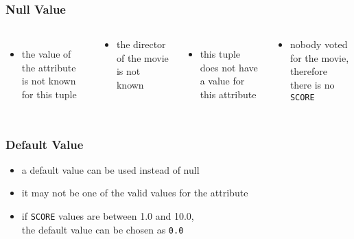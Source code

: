 \documentclass[dvipsnames]{beamer}
\theoremstyle{plain}
\begin{document}
\begin{frame}
  \frametitle{Null Value}

  \begin{columns}[t]
    \begin{itemize}
      \item the value of the attribute\\
	is not known for this tuple
    \end{itemize}

    \begin{example}
      \begin{itemize}
        \item the director of the movie\\
	  is not known
      \end{itemize}
    \end{example}

    \pause
    \begin{itemize}
      \item this tuple does not have\\
        a value for this attribute
    \end{itemize}

    \begin{example}
      \begin{itemize}
        \item nobody voted for the movie,\\
	  therefore there is no \texttt{SCORE}
      \end{itemize}
    \end{example}
  \end{columns}
\end{frame}

\begin{frame}
  \frametitle{Default Value}

  \begin{itemize}
    \item a default value can be used instead of null
    \item it may not be one of the valid values for the attribute
  \end{itemize}

  \begin{example}
    \begin{itemize}
      \item if \texttt{SCORE} values are between 1.0 and 10.0,\\
	the default value can be chosen as \texttt{0.0}
    \end{itemize}
  \end{example}
\end{frame}
\end{document}
